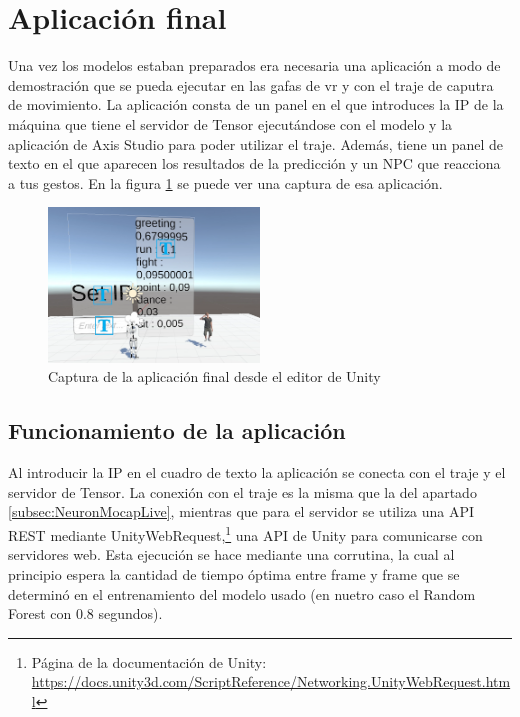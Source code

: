 \section{Aplicación final}
\label{sec:aplicacionFinal}
Una vez los modelos estaban preparados era necesaria una aplicación a modo de demostración que se pueda ejecutar en las gafas de \gls{vr} y con el traje de caputra de movimiento.
La aplicación consta de un panel en el que introduces la IP de la máquina que tiene el servidor de Tensor ejecutándose con el modelo y la aplicación de Axis Studio para poder utilizar el traje.
Además, tiene un panel de texto en el que aparecen los resultados de la predicción y un NPC que reacciona a tus gestos. En la figura \ref{fig:DemoCaptura} se puede ver una captura de esa aplicación.

\begin{figure}[H]
	\centering
	\includegraphics[width=0.5\textwidth]{Imagenes/Bitmap/Demo.PNG}
	\caption{Captura de la aplicación final desde el editor de Unity}
	\label{fig:DemoCaptura}
\end{figure}

\subsection{Funcionamiento de la aplicación}
Al introducir la IP en el cuadro de texto la aplicación se conecta con el traje y el servidor de Tensor.
La conexión con el traje es la misma que la del apartado \ref{subsec:NeuronMocapLive}, mientras que para el servidor se utiliza una \gls{API REST} mediante UnityWebRequest,\footnote{Página de la documentación de Unity: \url{https://docs.unity3d.com/ScriptReference/Networking.UnityWebRequest.html}} una API de Unity para comunicarse con servidores web.
Esta ejecución se hace mediante una corrutina, la cual al principio espera la cantidad de tiempo óptima entre frame y frame que se determinó en el entrenamiento del modelo usado (en nuetro caso el Random Forest con 0.8 segundos).

